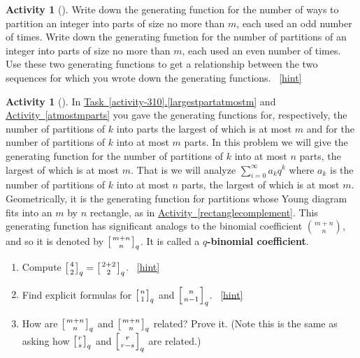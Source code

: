 \documentclass[10pt,]{book}
\newcommand{\terminology}[1]{\textbf{#1}}
\theoremstyle{plain}
\theoremstyle{definition}
\theoremstyle{definition}
\theoremstyle{definition}
\newtheorem{activity}[project]{Activity}
\numberwithin{equation}{chapter}
\newcommand{\qchoose}[2]{\left[{#1\atop#2}\right]_q}
\begin{document}
\begin{activity}[]\label{activity-319}
\hypertarget{p-1613}{}%
Write down the generating function for the number of ways to partition an integer into parts of size no more than \(m\), each used an odd number of times. Write down the generating function for the number of partitions of an integer into parts of size no more than \(m\), each used an even number of times. Use these two generating functions to get a relationship between the two sequences for which you wrote down the generating functions.%
~\hfill{\tiny\hyperlink{a-326}{[hint]}\hypertarget{q-326}{}}\end{activity}
\begin{activity}[]\label{qtorialformula}
\hypertarget{p-1616}{}%
In \hyperref[largestpartatmostm]{Task~\ref{activity-310}.\ref{largestpartatmostm}} and \hyperref[atmostmparts]{Activity~\ref{atmostmparts}} you gave the generating functions for, respectively, the number of partitions of \(k\) into parts the largest of which is at most \(m\) and for the number of partitions of \(k\) into at most \(m\) parts. In this problem we will give the generating function for the number of partitions of \(k\) into at most \(n\) parts, the largest of which is at most \(m\). That is we will analyze \(\sum_{i=0}^\infty a_kq^k\) where \(a_k\) is the number of partitions of \(k\) into at most \(n\) parts, the largest of which is at most \(m\). Geometrically, it is the generating function for partitions whose Young diagram fits into an \(m\) by \(n\) rectangle, as in \hyperref[rectanglecomplement]{Activity~\ref{rectanglecomplement}}. This generating function has significant analogs to the binomial coefficient \(\binom{m+n}{n}\), and so it is denoted by \(\qchoose{m+n}{n}\). It is called a \terminology{\(q\)-binomial coefficient}.%
\begin{enumerate}[font=\bfseries,label=(\alph*),ref=\alph*]
\item\label{task-281} \hypertarget{p-1617}{}%
Compute \(\qchoose{4}{2}=\qchoose{2+2}{2}\).%
~\hfill{\tiny\hyperlink{a-327.a}{[hint]}\hypertarget{q-327.a}{}}\item\label{task-282} \hypertarget{p-1620}{}%
Find explicit formulas for \(\qchoose{n}{1}\) and \(\qchoose{n}{n-1}\).%
~\hfill{\tiny\hyperlink{a-327.b}{[hint]}\hypertarget{q-327.b}{}}\item\label{task-283} \hypertarget{p-1623}{}%
How are \(\qchoose{m+n}{n}\) and \(\qchoose{m+n}{n}\) related? Prove it. (Note this is the same as asking how \(\qchoose{r}{s}\) and \(\qchoose{r}{r-s}\) are related.)%

\end{enumerate}
\end{activity}
\end{document}
